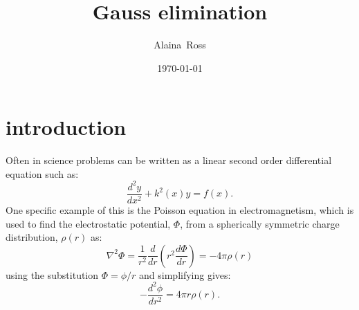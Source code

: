 \documentclass[prc,amsmath,twocolumn,superscriptaddress]{revtex4}
\begin{document}
  \newcommand {\nc} {\newcommand}
  \nc {\Sec} [1] {Sec.~\ref{#1}}
  \nc {\IR} [1] {\textcolor{red}{#1}} 

\title{Gauss elimination}


\author{Alaina~Ross}

\date{\today}


\begin{abstract}
\end{abstract}


\maketitle

\section{introduction}
\label{intro}
Often in science problems can be written as a linear second order differential equation such as:
\begin{equation}
\frac{d^2y}{dx^2}+k^2(x)y=f(x).
\end{equation}
One specific example of this is the Poisson equation in electromagnetism, which is used to find the electrostatic potential, $\Phi$, from a spherically symmetric charge distribution, $\rho (r)$ as:
\begin{equation}
\nabla^2\Phi=\frac{1}{r^2}\frac{d}{dr}\left(r^2\frac{d\Phi}{dr}\right)=-4\pi \rho(r)
\end{equation}
using the substitution $\Phi=\phi/r$ and simplifying gives:
\begin{equation}
-\frac{d^2\phi}{dr^2}=4\pi r \rho(r).
\end{equation}
\end{document}
